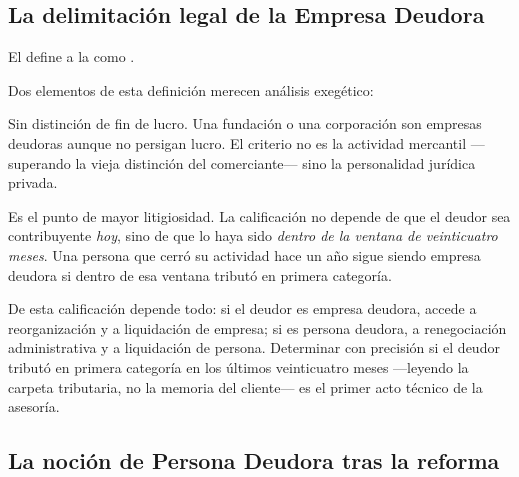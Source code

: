 \subsection{La delimitación legal de la Empresa Deudora}

El   \parencite{ley-20720} define a la \empresadeudora{} como .

Dos elementos de esta definición merecen análisis exegético:

\begin{description}[leftmargin=0pt,style=nextline,font=\sffamily\bfseries]
  \item[Toda persona jurídica de derecho privado] Sin distinción de fin de lucro. Una
  fundación o una corporación son empresas deudoras aunque no persigan lucro. El criterio no
  es la actividad mercantil ---superando la vieja distinción del comerciante--- sino la
  personalidad jurídica privada.

  \item[La persona natural contribuyente de primera categoría en los últimos 24 meses] Es el
  punto de mayor litigiosidad. La calificación no depende de que el deudor sea contribuyente
  \emph{hoy}, sino de que lo haya sido \emph{dentro de la ventana de veinticuatro meses}. Una
  persona que cerró su actividad hace un año sigue siendo empresa deudora si dentro de esa
  ventana tributó en primera categoría.
\end{description}

\begin{foco}
De esta calificación depende todo: si el deudor es empresa deudora, accede a reorganización y
a liquidación de empresa; si es persona deudora, a renegociación administrativa y a
liquidación de persona. Determinar con precisión si el deudor tributó en primera categoría en
los últimos veinticuatro meses ---leyendo la carpeta tributaria, no la memoria del cliente---
es el primer acto técnico de la asesoría.
\end{foco}

\subsection{La noción de Persona Deudora tras la reforma}

